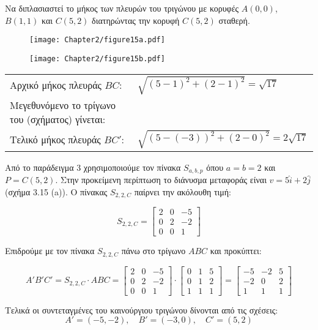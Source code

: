 \begin{example}
Να διπλασιαστεί το μήκος των πλευρών του τριγώνου με κορυφές $A(0,0)$, $B(1,1)$ και $C(5,2)$ διατηρώντας την κορυφή $C(5,2)$ σταθερή.
\end{example}
\begin{solution}
	

\begin{figure}[h!]
	\begin{center}
		\begin{minipage}[b]{0.45\textwidth} %
		    \texttt{[image: Chapter2/figure15a.pdf]}
		\end{minipage}%
	\hfill
		\begin{minipage}[b]{0.4\textwidth} %
		    \texttt{[image: Chapter2/figure15b.pdf]}
		\end{minipage}
	\end{center}
\end{figure}


\begin{tabular}{m{}m{}}
	Αρχικό μήκος πλευράς $BC$: & $\sqrt{(5-1)^2 + (2-1)^2} = \sqrt{17}$ \\
	Μεγεθυνόμενο το τρίγωνο του (σχήματος) γίνεται: & \\
	Τελικό μήκος πλευράς $BC'$: & $\sqrt{(5-(-3))^2 + (2-0)^2} = 2 \sqrt{17}$
\end{tabular}


Από το παράδειγμα 3 χρησιμοποιούμε τον πίνακα $S_{a,b,p}$ όπου $a=b=2$ και $P=C(5,2)$. Στην προκείμενη περίπτωση το διάνυσμα μεταφοράς είναι $v=5\hat{i}+2\hat{j}$ (σχήμα 3.15 (a)). Ο πίνακας $S_{2,2,C}$ παίρνει την ακόλουθη τιμή:

\[
S_{2,2,C} = \begin{bmatrix}
2 & 0 & -5 \\
0 & 2 & -2 \\
0 & 0 & 1
\end{bmatrix}
\]

Επιδρούμε με τον πίνακα $S_{2,2,C}$ πάνω στο τρίγωνο $ABC$ και προκύπτει:

\[
A'B'C' = S_{2,2,C} \cdot ABC = \begin{bmatrix}
2 & 0 & -5 \\
0 & 2 & -2 \\
0 & 0 & 1
\end{bmatrix} \cdot \begin{bmatrix}
0 & 1 & 5 \\
0 & 1 & 2 \\
1 & 1 & 1
\end{bmatrix} = \begin{bmatrix}
-5 & -2 & 5 \\
-2 & 0 & 2 \\
1 & 1 & 1
\end{bmatrix}
\]

Τελικά οι συντεταγμένες του καινούργιου τριγώνου δίνονται από τις σχέσεις:
\[
A' = (-5, -2), \quad B' = (-3, 0), \quad C' = (5, 2)
\]

\end{solution}